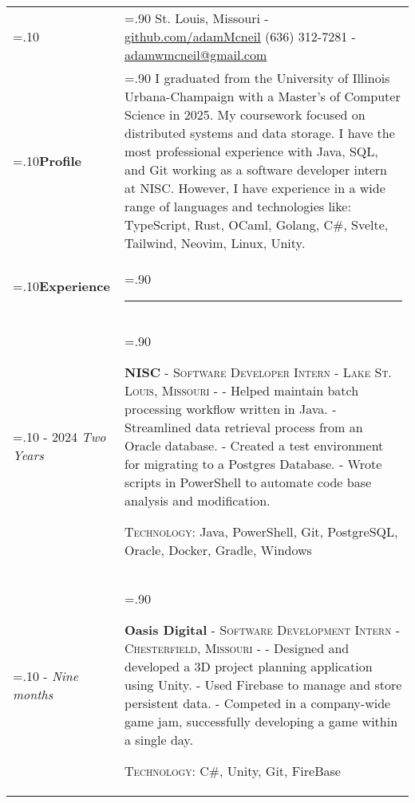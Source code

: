\documentclass[10pt]{article}
\newcommand{\timeFrame}[3] {
  \if\relax\detokenize{#2}\relax
    #1
  \else
    #1 - #2
  \fi
  \newline
  \scriptsize \textit{#3}
}
\newcommand{\entry}[6] {
  \textbf{#1}
  \if\relax\detokenize{#2}\relax
  \else
       - \textsc{#2}
  \fi
  \if\relax\detokenize{#3}\relax
  \else
      - \textsc{#3}
  \fi
  \if\relax\detokenize{#4}\relax
  \else
      - \href{https://#4}{#4}
  \fi
  \newline #5
  \if\relax\detokenize{#6}\relax
  \else
      \newline \textsc{Technology:} #6
  \fi
  \\
}
\newcommand{\horizontalLine}[0] {
    \noindent\rule{.90\linewidth}{0.4pt}
}
\begin{document}

\begin{tabularx}{\linewidth}{>{\hsize=.10\hsize}X>{\hsize=.90\hsize}X}

{\bfseries\large Adam McNeil} &
St. Louis, Missouri - \href{https://github.com/adamMcneil}{github.com/adamMcneil}\newline
{(636) 312-7281 \hspace{5.5mm} - \href{mailto:adamwmcneil@gmail.com}{adamwmcneil@gmail.com}} \\[5pt]

\textbf{Profile} &
{
  I graduated from the University of Illinois Urbana-Champaign with a Master's of Computer Science in 2025.
  My coursework focused on distributed systems and data storage.
  I have the most professional experience with Java, SQL, and Git working as a software developer intern at NISC.
  However, I have experience in a wide range of languages and technologies like: TypeScript, Rust, OCaml, Golang, C\#, Svelte, Tailwind, Neovim, Linux, Unity.
} \\

\textbf{Experience} & \horizontalLine \\

\timeFrame{2023}{2024}{Two Years} &
\entry{NISC}
  {Software Developer Intern}
  {Lake St. Louis, Missouri}
  {}
  {
  - Helped maintain batch processing workflow written in Java. \newline
  - Streamlined data retrieval process from an Oracle database. \newline
  - Created a test environment for migrating to a Postgres Database. \newline
  - Wrote scripts in PowerShell to automate code base analysis and modification.
  }
  {Java, PowerShell, Git, PostgreSQL, Oracle, Docker, Gradle, Windows \newline}

\timeFrame{2022}{}{Nine months} &
\entry{Oasis Digital}
  {Software Development Intern}
  {Chesterfield, Missouri}
  {}
  {
  - Designed and developed a 3D project planning application using Unity. \newline
  - Used Firebase to manage and store persistent data. \newline
  - Competed in a company-wide game jam, successfully developing a game within a single day.
  }
  {C\#, Unity, Git, FireBase}



\end{tabularx}
\end{document}
